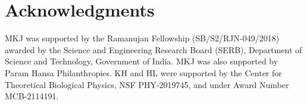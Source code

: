 \documentclass[11pt]{article}
\begin{document}




\section{Acknowledgments}

MKJ was supported by the Ramanujan Fellowship (SB/S2/RJN-049/2018) awarded by the Science and Engineering Research Board (SERB), Department of Science and Technology, Government of India. MKJ was also supported by Param Hansa Philanthropies. KH and HL were supported by the Center for Theoretical Biological Physics, NSF PHY-2019745, and under Award Number MCB-2114191.
\end{document}
